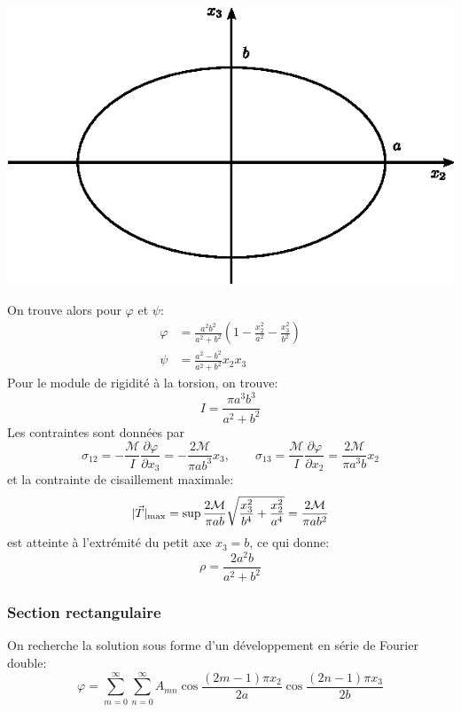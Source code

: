 \begin{center}
        \includegraphics{../images/T1_Ch07-16}
    \end{center}


On trouve alors pour $\varphi$ et $\psi$:
\begin{align}
    \varphi &= \frac{a^2 b^2}{a^2 + b^2} \left(1-\frac{x_2^2}{a^2}-\frac{x_3^2}{b^2} \right) \label{eq:Ch07-082}\\
    \psi &= \frac{a^2 - b^2}{a^2 + b^2} x_2 x_3 \label{eq:Ch07-083}
\end{align}
Pour le module de rigidité à la torsion, on trouve:
\begin{equation}
    I = \frac{\pi a^3 b^3}{a^2 + b^2}
    \label{eq:Ch07-084}
\end{equation}
Les contraintes sont données par
\begin{equation}
        \sigma_{12} = - \frac{\mathcal{M}}{I} \frac{\partial \varphi}{\partial x_3} = - \frac{2 \mathcal{M}}{\pi a b^3} x_3 ,\qquad
        \sigma_{13} = \frac{\mathcal{M}}{I}\frac{\partial \varphi}{\partial x_2} = \frac{2 \mathcal{M}}{\pi a^3 b} x_2
    \label{eq:Ch07-085}
\end{equation}
et la contrainte de cisaillement maximale:
\begin{equation}
    \lvert\vec{T}\rvert_{\text{max}} = \sup \frac{2\mathcal{M}}{\pi a b} \sqrt{\frac{x_3^2}{b^4} + \frac{x_2^2}{a^4}} = \frac{2\mathcal{M}}{\pi a b^2}
    \label{eq:Ch07-086}
\end{equation}
est atteinte à l'extrémité du petit axe $x_3 = b$, ce qui donne: 
\begin{equation}
    \rho = \frac{2 a^2 b}{a^2 + b^2}
    \label{eq:Ch07-087}
\end{equation}
\subsubsection{Section rectangulaire}
On recherche la solution sous forme d'un développement en série de Fourier double: 
\begin{equation}
    \varphi = \sum_{m=0}^{\infty} \sum_{n=0}^{\infty} A_{mn} \cos \frac{(2m-1)\pi x_2}{2a} \cos \frac{(2n-1)\pi x_3}{2b}
    \label{eq:Ch07-088}
\end{equation}

